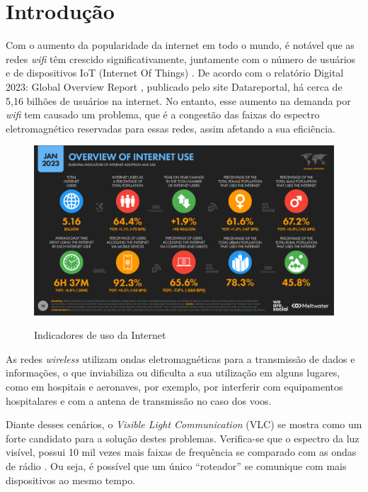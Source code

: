 \section{Introdução}

Com o aumento da popularidade da internet em todo o mundo, é notável que as redes \textit{wifi} têm crescido significativamente, juntamente com o número de usuários e de dispositivos IoT (Internet Of Things) \cite{matheus2017comunicaccao}. De acordo com o relatório Digital 2023: Global Overview Report \cite{datareportal}, publicado pelo site Datareportal, há cerca de 5,16 bilhões de usuários na internet. No entanto, esse aumento na demanda por \textit{wifi} tem causado um problema, que é a congestão das faixas do espectro eletromagnético reservadas para essas redes, assim afetando a sua eficiência.\newline

\begin{figure}[!htbp]
  \caption{Indicadores de uso da Internet}
  \includegraphics[scale=0.4]{images/internet_use.png}
  \label{figura:usoInternet}
\end{figure}

As redes \textit{wireless} utilizam ondas eletromagnéticas para a transmissão de dados e informações, o que inviabiliza ou dificulta a sua utilização em alguns lugares, como em hospitais e aeronaves, por exemplo, por interferir com equipamentos hospitalares e com a antena de transmissão no caso dos voos.

Diante desses cenários, o \textit{Visible Light Communication} (VLC) se mostra como um forte candidato para a solução destes problemas.
Verifica-se que o espectro da luz visível, possui 10 mil vezes mais faixas de frequência se comparado com as ondas de rádio \cite[p. 14]{conceiccao2015comunicaccao}.
Ou seja, é possível que um único ``roteador” se comunique com mais dispositivos ao mesmo tempo.

